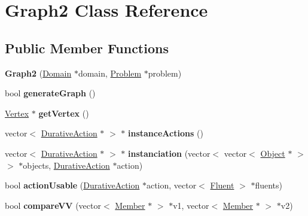 \hypertarget{classGraph2}{\section{Graph2 Class Reference}
\label{classGraph2}
}
\subsection*{Public Member Functions}
\begin{DoxyCompactItemize}
\item 
\hypertarget{classGraph2_a027a5181814903fe2b0b2aa393c6303c}{{\bfseries Graph2} (\hyperlink{classDomain}{Domain} $\ast$domain, \hyperlink{classProblem}{Problem} $\ast$problem)}\label{classGraph2_a027a5181814903fe2b0b2aa393c6303c}

\item 
\hypertarget{classGraph2_a9707df3e11b8838a0ecbc5d9465c6b00}{bool {\bfseries generate\+Graph} ()}\label{classGraph2_a9707df3e11b8838a0ecbc5d9465c6b00}

\item 
\hypertarget{classGraph2_a4a0c642568c92c74b2c9dcf9acefa328}{\hyperlink{classVertex}{Vertex} $\ast$ {\bfseries get\+Vertex} ()}\label{classGraph2_a4a0c642568c92c74b2c9dcf9acefa328}

\item 
\hypertarget{classGraph2_a14a09cb3c5370c4a660799f5bc729054}{vector$<$ \hyperlink{classDurativeAction}{Durative\+Action} $\ast$ $>$ $\ast$ {\bfseries instance\+Actions} ()}\label{classGraph2_a14a09cb3c5370c4a660799f5bc729054}

\item 
\hypertarget{classGraph2_a6d0328f852a8b01ce228d5638640103f}{vector$<$ \hyperlink{classDurativeAction}{Durative\+Action} $\ast$ $>$ $\ast$ {\bfseries instanciation} (vector$<$ vector$<$ \hyperlink{classObject}{Object} $\ast$ $>$ $>$ $\ast$objects, \hyperlink{classDurativeAction}{Durative\+Action} $\ast$action)}\label{classGraph2_a6d0328f852a8b01ce228d5638640103f}

\item 
\hypertarget{classGraph2_abca296428c0a85d77efcde9f6d5d37ad}{bool {\bfseries action\+Usable} (\hyperlink{classDurativeAction}{Durative\+Action} $\ast$action, vector$<$ \hyperlink{classFluent}{Fluent} $>$ $\ast$fluents)}\label{classGraph2_abca296428c0a85d77efcde9f6d5d37ad}

\item 
\hypertarget{classGraph2_ad86101a9804214b077ade4f84c52cff6}{bool {\bfseries compare\+V\+V} (vector$<$ \hyperlink{classMember}{Member} $\ast$ $>$ $\ast$v1, vector$<$ \hyperlink{classMember}{Member} $\ast$ $>$ $\ast$v2)}\label{classGraph2_ad86101a9804214b077ade4f84c52cff6}


\end{DoxyCompactItemize}
